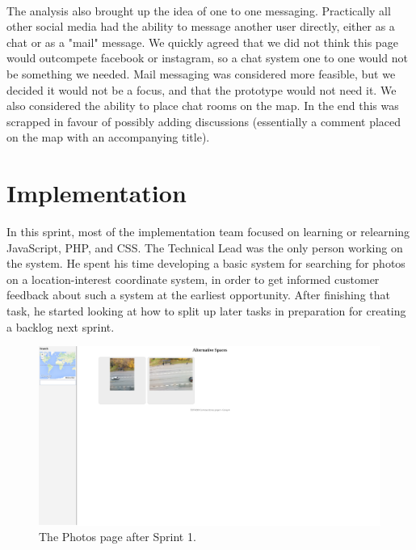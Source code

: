 \paragraph{} The analysis also brought up the idea of one to one messaging. Practically all other social media had the ability to message another user directly, either as a chat or as a "mail" message. We quickly agreed that we did not think this page would outcompete facebook or instagram, so a chat system one to one would not be something we needed. Mail messaging was considered more feasible, but we decided it would not be a focus, and that the prototype would not need it. We also considered the ability to place chat rooms on the map. In the end this was scrapped in favour of possibly adding discussions (essentially a comment placed on the map with an accompanying title).

\section{Implementation}
\label{sec:S1Implementation}
In this sprint, most of the implementation team focused on learning or relearning JavaScript, PHP, and CSS. The Technical Lead was the only person working on the system. He spent his time developing a basic system for searching for photos on a location-interest coordinate system, in order to get informed customer feedback about such a system at the earliest opportunity. After finishing that task, he started looking at how to split up later tasks in preparation for creating a backlog next sprint.

\begin{figure}[ht!]
\centering
\includegraphics[width=\linewidth]{./img/webpage/22Sep/Photos22Sep}
\caption{The Photos page after Sprint 1. \label{fig:Photos22Sep}}
\end{figure}

